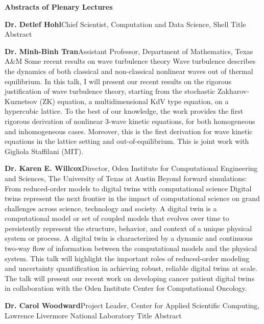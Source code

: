 \begin{center}
{\Large \bfseries Abstracts of Plenary Lectures}
\end{center}
\vspace{1ex}



\label{plenary1}
\abs
{{\bfseries Dr. Detlef Hohl}}{Chief Scientist, Computation and Data Science, Shell}
{Title}
{Abstract}
\bigskip


\label{plenary2}
\abs
{{\bfseries Dr. Minh-Binh Tran}}{Assistant Professor, Department of Mathematics, Texas A\&M}
{Some recent results on wave turbulence theory}
{Wave turbulence describes the dynamics of both classical and non-classical nonlinear waves out of thermal equilibrium. In this talk, I will present our recent results on the rigorous justification of wave turbulence theory, starting from the stochastic Zakharov-Kuznetsov (ZK) equation, a multidimensional KdV type equation, on a hypercubic lattice. To the best of our knowledge, the work provides the first rigorous derivation of nonlinear 3-wave kinetic equations, for both homogeneous and inhomogeneous cases. Moreover, this is the first derivation for wave kinetic equations in the lattice setting and out-of-equilibrium. This is joint work with Gigliola Staffilani (MIT).}
\bigskip


\label{plenary3}
\abs
{{\bfseries Dr. Karen E. Willcox}}{Director, Oden Institute for Computational Engineering and Sciences, The University of Texas at Austin}
{Beyond forward simulations: From reduced-order models to digital twins with computational science}
{Digital twins represent the next frontier in the impact of computational science on grand challenges across science, technology and society. A digital twin is a computational model or set of coupled models that evolves over time to persistently represent the structure, behavior, and context of a unique physical system or process. A digital twin is characterized by a dynamic and continuous two-way flow of information between the computational models and the physical system. This talk will highlight the important roles of reduced-order modeling and uncertainty quantification in achieving robust, reliable digital twins at scale. The talk will present our recent work on developing cancer patient digital twins in collaboration with the Oden Institute Center for Computational Oncology.}
\bigskip


\label{plenary4}
\abs
{{\bfseries Dr. Carol Woodward}}{Project Leader, Center for Applied Scientific Computing, Lawrence Livermore National Laboratory}
{Title}
{Abstract}


